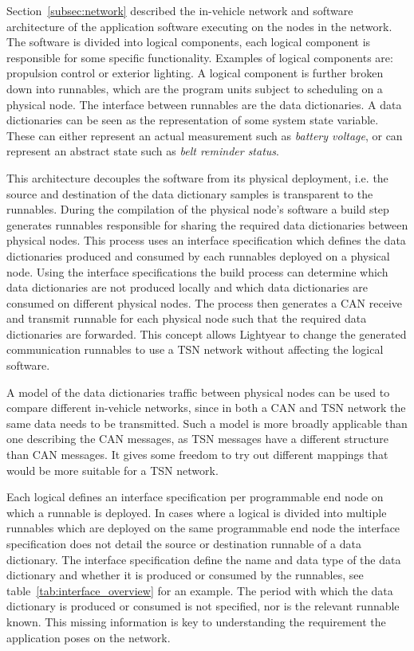\label{subsec:model_gen}
Section~\ref{subsec:network} described the in-vehicle network and software architecture of the application software executing on the nodes in the network. The software is divided into logical components, each logical component is responsible for some specific functionality. Examples of logical components are: propulsion control or exterior lighting. A logical component is further broken down into runnables, which are the program units subject to scheduling on a physical node. The interface between runnables are the data dictionaries. A data dictionaries can be seen as the representation of some system state variable. These can either represent an actual measurement such as \textit{battery voltage}, or can represent an abstract state such as \textit{belt reminder status}. 

This architecture decouples the software from its physical deployment, i.e. the source and destination of the data dictionary samples is transparent to the runnables. During the compilation of the physical node's software a build step generates runnables responsible for sharing the required data dictionaries between physical nodes. This process uses an interface specification which defines the data dictionaries produced and consumed by each runnables deployed on a physical node. Using the interface specifications the build process can determine which data dictionaries are not produced locally and which data dictionaries are consumed on different physical nodes. The process then generates a CAN receive and transmit runnable for each physical node such that the required data dictionaries are forwarded. This concept allows Lightyear to change the generated communication runnables to use a TSN network without affecting the logical software.

A model of the data dictionaries traffic between physical nodes can be used to compare different in-vehicle networks, since in both a CAN and TSN network the same data needs to be transmitted. Such a model is more broadly applicable than one describing the CAN messages, as TSN messages have a different structure than CAN messages. It gives some freedom to try out different mappings that would be more suitable for a TSN network.

Each logical defines an interface specification per programmable end node on which a runnable is deployed. In cases where a logical is divided into multiple runnables which are deployed on the same programmable end node the interface specification does not detail the source or destination runnable of a data dictionary. The interface specification define the name and data type of the data dictionary and whether it is produced or consumed by the runnables, see table~\ref{tab:interface_overview} for an example. The period with which the data dictionary is produced or consumed is not specified, nor is the relevant runnable known. This missing information is key to understanding the requirement the application poses on the network. 

